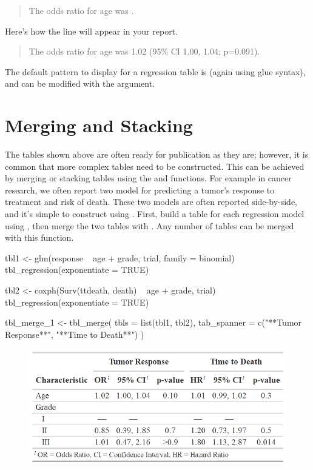 \begin{quote}
The odds ratio for age was .
\end{quote}

Here's how the line will appear in your report.

\begin{quote}
The odds ratio for age was 1.02 (95\% CI 1.00, 1.04; p=0.091).
\end{quote}

The default pattern to display for a regression table is  (again using glue syntax), and can be modified with the  argument. 

\section{Merging and Stacking}

The  tables shown above are often ready for publication as they are; however, it is common that more complex tables need to be constructed. This can be achieved by merging or stacking  tables using the  and  functions.
For example in cancer research, we often report two model for predicting a tumor's response to treatment and risk of death.
These two models are often reported side-by-side, and it's simple to construct using .
First, build a table for each regression model using , then merge the two tables with .
Any number of  tables can be merged with this function.

\begin{example}
tbl1 <- 
  glm(response ~ age + grade, trial, family = binomial) %
  tbl_regression(exponentiate = TRUE)

tbl2 <-
  coxph(Surv(ttdeath, death) ~ age + grade, trial) %
  tbl_regression(exponentiate = TRUE) 

tbl_merge_1 <-
  tbl_merge(
    tbls = list(tbl1, tbl2),
    tab_spanner = c("**Tumor Response**", "**Time to Death**")
  )
\end{example}
\newpage

\begin{figure}[h!]
  \includegraphics[scale=0.49]{merge.png}
  \centering
\end{figure}

